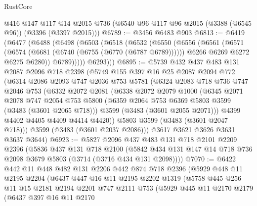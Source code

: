 \begin{lexlean}{RustCore}
\begin{coremodule}
    @416
    @147
    @117
    @14
    @2015
    @736
    (@6540 @96 @117 @96 @2015 (@3388 (@6545 @96)) (@3396 (@3397 @2015)))
@6789 := @3456 @6483 @903
@6813 := @6419
    (@6477
      (@6488
        (@6498
          (@6503
            (@6518
              (@6532
                (@6550
                  (@6556
                    (@6561
                      (@6571
                        (@6574 (@6681 (@6740 (@6755 (@6770 (@6787 @6789))))))
                        @6266
                        @6269
                        @6272
                        @6275
                        @6280))
                    @6789)))))
          @6293)))
@6895 := @5739
    @432
    @437
    @483
    @131
    @2087
    @2096
    @718
    @2398
    (@5749
      @155
      @397
      @16
      @25
      @2087
      @2094
      @772
      (@6314
        @2086
        @2093
        @747
        @2036
        @753
        @5781
        (@6324
          @2083
          @718
          @736
          @747
          @2046
          @753
          (@6332
            @2072
            @2081
            (@6338
              @2072
              @2079
              @1000
              (@6345
                @2071
                @2078
                @747
                @2054
                @753
                @5800
                (@6359 @2064 @753 @6369 @5803 @3599 (@3483 (@3601 @2065 @718)))
                @3599
                (@3483 (@3601 @2055 @2071)))
              @4399
              @4402
              @4405
              @4409
              @4414
              @4420))
          @5803
          @3599
          (@3483 (@3601 @2047 @718)))
        @3599
        (@3483 (@3601 @2037 @2086)))
      @3617
      @3621
      @3626
      @3631
      @3637
      @3644)
@6923 := @5827
    @2096
    @437
    @483
    @131
    @718
    @2101
    @2209
    @2396
    (@5836
      @437
      @131
      @718
      @2100
      (@5842 @434 @131 @147 @14 @718 @736 @2098 @3679 @5803 (@3714 (@3716 @434 @131 @2098))))
@7070 := @6422
    @442
    @11
    @448
    @482
    @131
    @2206
    @442
    @874
    @718
    @2396
    (@5929
      @448
      @11
      @2195
      @2204
      (@6437
        @447
        @16
        @11
        @2195
        @2202
        @1319
        (@5758
          @445
          @256
          @11
          @15
          @2181
          @2194
          @2201
          @747
          @2111
          @753
          (@5929
            @445
            @11
            @2170
            @2179
            (@6437
              @397
              @16
              @11
              @2170

\end{coremodule}
\end{lexlean}
